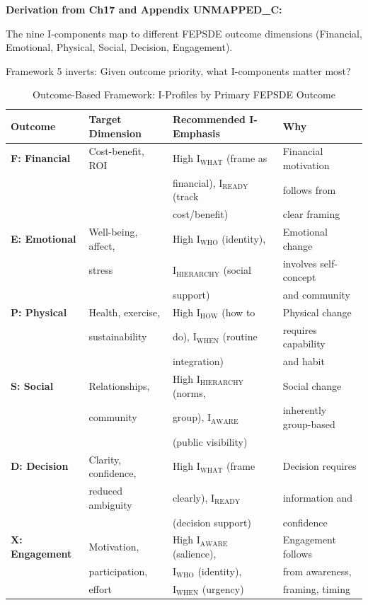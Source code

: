 \textbf{Derivation from Ch17 and Appendix UNMAPPED_C:}

The nine I-components map to different FEPSDE outcome dimensions (Financial, Emotional, Physical, Social, Decision, Engagement).

Framework 5 inverts: Given outcome priority, what I-components matter most?

\begin{table}[htbp]
\centering
\caption{Outcome-Based Framework: I-Profiles by Primary FEPSDE Outcome}
\label{tab:20-f5-outcomes}
\renewcommand{\arraystretch}{1.3}
\footnotesize
\begin{tabular}{@{}llll@{}}
\toprule
\textbf{Outcome} & \textbf{Target Dimension} & \textbf{Recommended I-Emphasis} & \textbf{Why} \\
\midrule
\textbf{F: Financial} & Cost-benefit, ROI & High I$_{\text{WHAT}}$ (frame as & Financial motivation \\
& & financial), I$_{\text{READY}}$ (track & follows from \\
& & cost/benefit) & clear framing \\
\midrule
\textbf{E: Emotional} & Well-being, affect, & High I$_{\text{WHO}}$ (identity), & Emotional change \\
& stress & I$_{\text{HIERARCHY}}$ (social & involves self-concept \\
& & support) & and community \\
\midrule
\textbf{P: Physical} & Health, exercise, & High I$_{\text{HOW}}$ (how to & Physical change \\
& sustainability & do), I$_{\text{WHEN}}$ (routine & requires capability \\
& & integration) & and habit \\
\midrule
\textbf{S: Social} & Relationships, & High I$_{\text{HIERARCHY}}$ (norms, & Social change \\
& community & group), I$_{\text{AWARE}}$ & inherently group-based \\
& & (public visibility) & \\
\midrule
\textbf{D: Decision} & Clarity, confidence, & High I$_{\text{WHAT}}$ (frame & Decision requires \\
& reduced ambiguity & clearly), I$_{\text{READY}}$ & information and \\
& & (decision support) & confidence \\
\midrule
\textbf{X: Engagement} & Motivation, & High I$_{\text{AWARE}}$ (salience), & Engagement follows \\
& participation, & I$_{\text{WHO}}$ (identity), & from awareness, \\
& effort & I$_{\text{WHEN}}$ (urgency) & framing, timing \\
\bottomrule
\end{tabular}
\end{table}

